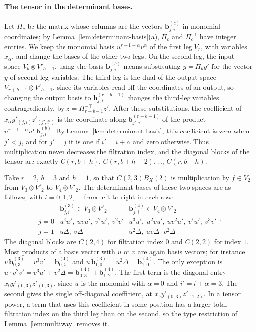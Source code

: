 \paragraph{The tensor in the determinant bases.}
Let \(\Pi_c\) be the matrix whose columns are the vectors
\(\mathbf b^{(c)}_{j,i}\) in monomial coordinates; by
Lemma~\ref{lem:determinant-basis}(a), \(\Pi_c\) and \(\Pi_c^{-1}\) have
integer entries. We keep the monomial basis \(u^{r-1-\alpha}v^\alpha\) of
the first leg \(V_r\), with variables \(x_\alpha\), and change the bases of
the other two legs. On the second leg, the input space
\(V_b\otimes V'_{h+1}\), using the basis \(\mathbf b^{(b)}_{j,i}\) means
substituting \(y=\Pi_by'\) for the vector \(y\) of second-leg variables.
The third leg is the dual of the output space \(V_{r+b-1}\otimes V'_{h+1}\),
since its variables read off the coordinates of an output, so changing the
output basis to \(\mathbf b^{(r+b-1)}_{j,i}\) changes the third-leg
variables contragrediently, by \(z=\Pi_{r+b-1}^{-\top}z'\). After these
substitutions, the coefficient of \(x_\alpha y'_{(j,i)}z'_{(j',i')}\) is
the coordinate along \(\mathbf b^{(r+b-1)}_{j',i'}\) of the product
\(u^{r-1-\alpha}v^\alpha\,\mathbf b^{(b)}_{j,i}\). By
Lemma~\ref{lem:determinant-basis}, this coefficient is zero when
\(j'<j\), and for \(j'=j\) it is one if \(i'=i+\alpha\) and zero otherwise.
Thus multiplication never decreases the filtration index, and the
diagonal blocks of the tensor are exactly \(C(r,b+h)\), \(C(r,b+h-2)\),
\ldots, \(C(r,b-h)\).

\begin{example}\label{ex:determinant-basis}
Take \(r=2\), \(b=3\) and \(h=1\), so that \(C(2,3)B_X(2)\) is
multiplication by \(f\in V_2\) from \(V_3\otimes V'_2\) to
\(V_4\otimes V'_2\). The determinant bases of these two spaces are as
follows, with \(i=0,1,2,\ldots\) from left to right in each row:
\[
\begin{array}{c|l|l}
 &\mathbf b^{(3)}_{j,i}\in V_3\otimes V'_2
 &\mathbf b^{(4)}_{j,i}\in V_4\otimes V'_2\\ \hline
 j=0&u^2u',\ uvu',\ v^2u',\ v^2v'
    &u^3u',\ u^2vu',\ uv^2u',\ v^3u',\ v^3v'\\
 j=1&u\Delta,\ v\Delta&u^2\Delta,\ uv\Delta,\ v^2\Delta
\end{array}.
\]
The diagonal blocks are \(C(2,4)\) for filtration index \(0\) and
\(C(2,2)\) for index \(1\). Most products of a basis vector with \(u\)
or \(v\) are again basis vectors; for instance
\(v\,\mathbf b^{(3)}_{0,3}=v^3v'=\mathbf b^{(4)}_{0,4}\) and
\(u\,\mathbf b^{(3)}_{1,0}=u^2\Delta=\mathbf b^{(4)}_{1,0}\). The only
exception is
\(u\cdot v^2v'=v^3u'+v^2\Delta
=\mathbf b^{(4)}_{0,3}+\mathbf b^{(4)}_{1,2}\).
The first term is the diagonal entry \(x_0y'_{(0,3)}z'_{(0,3)}\), since
\(u\) is the monomial with \(\alpha=0\) and \(i'=i+\alpha=3\). The second
gives the single off-diagonal coefficient, at
\(x_0y'_{(0,3)}z'_{(1,2)}\). In a tensor power, a term that uses this
coefficient in some position has a larger total filtration index on the
third leg than on the second, so the type restriction of
Lemma~\ref{lem:multiway} removes it.
\end{example}

